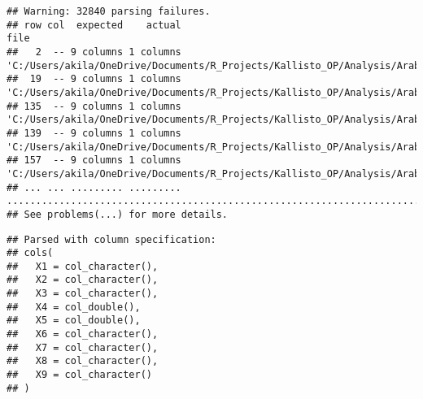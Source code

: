 \documentclass[]{article}
\newenvironment{Shaded}{\begin{snugshade}}{\end{snugshade}}
\newcommand{\CharTok}[1]{\textcolor[rgb]{0.31,0.60,0.02}{#1}}
\newcommand{\CommentTok}[1]{\textcolor[rgb]{0.56,0.35,0.01}{\textit{#1}}}
\newcommand{\ControlFlowTok}[1]{\textcolor[rgb]{0.13,0.29,0.53}{\textbf{#1}}}
\newcommand{\DataTypeTok}[1]{\textcolor[rgb]{0.13,0.29,0.53}{#1}}
\newcommand{\DecValTok}[1]{\textcolor[rgb]{0.00,0.00,0.81}{#1}}
\newcommand{\KeywordTok}[1]{\textcolor[rgb]{0.13,0.29,0.53}{\textbf{#1}}}
\newcommand{\NormalTok}[1]{#1}
\newcommand{\OperatorTok}[1]{\textcolor[rgb]{0.81,0.36,0.00}{\textbf{#1}}}
\newcommand{\StringTok}[1]{\textcolor[rgb]{0.31,0.60,0.02}{#1}}
\begin{document}
\begin{verbatim}
## Warning: 32840 parsing failures.
## row col  expected    actual                                                                                                    file
##   2  -- 9 columns 1 columns 'C:/Users/akila/OneDrive/Documents/R_Projects/Kallisto_OP/Analysis/Arabidopsis_thaliana.TAIR10.44.gff3'
##  19  -- 9 columns 1 columns 'C:/Users/akila/OneDrive/Documents/R_Projects/Kallisto_OP/Analysis/Arabidopsis_thaliana.TAIR10.44.gff3'
## 135  -- 9 columns 1 columns 'C:/Users/akila/OneDrive/Documents/R_Projects/Kallisto_OP/Analysis/Arabidopsis_thaliana.TAIR10.44.gff3'
## 139  -- 9 columns 1 columns 'C:/Users/akila/OneDrive/Documents/R_Projects/Kallisto_OP/Analysis/Arabidopsis_thaliana.TAIR10.44.gff3'
## 157  -- 9 columns 1 columns 'C:/Users/akila/OneDrive/Documents/R_Projects/Kallisto_OP/Analysis/Arabidopsis_thaliana.TAIR10.44.gff3'
## ... ... ......... ......... .......................................................................................................
## See problems(...) for more details.
\end{verbatim}

\begin{Shaded}
\end{Shaded}

\begin{verbatim}
## Parsed with column specification:
## cols(
##   X1 = col_character(),
##   X2 = col_character(),
##   X3 = col_character(),
##   X4 = col_double(),
##   X5 = col_double(),
##   X6 = col_character(),
##   X7 = col_character(),
##   X8 = col_character(),
##   X9 = col_character()
## )
\end{verbatim}
\end{document}
